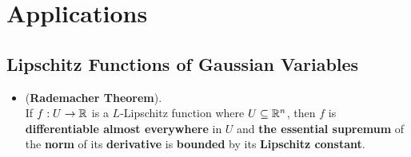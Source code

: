 \documentclass[11pt]{article}
\begin{document}
\section{Applications}
\subsection{Lipschitz Functions of Gaussian Variables}
\begin{itemize}
\item \begin{theorem} (\textbf{Rademacher Theorem}).\\
If $f: U \to {\mathbb R}$ is a $L$-Lipschitz function where $U \subseteq {\mathbb R}^n$, then $f$ is \textbf{differentiable almost everywhere} in $U$ and \textbf{the essential supremum} of the \textbf{norm} of its \textbf{derivative}  is \textbf{bounded} by its \textbf{Lipschitz constant}. 
\end{theorem}


\end{itemize}
\end{document}
